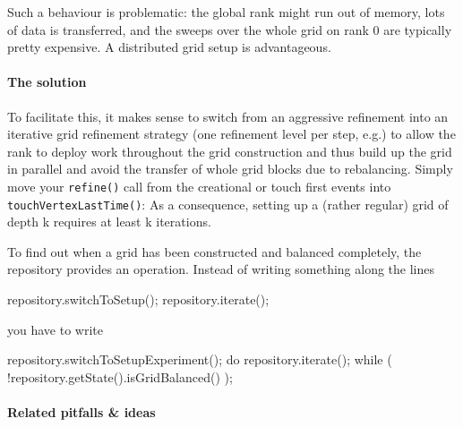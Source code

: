 Such a behaviour is problematic: the global rank might run out of memory, lots
of data is transferred, and the sweeps over the whole grid on rank 0 are
typically pretty expensive. 
A distributed grid setup is advantageous.

\paragraph{The solution}

To facilitate this, it makes sense to switch from an aggressive
refinement into an iterative grid refinement strategy (one refinement level per
step, e.g.) to allow the rank to deploy work throughout the grid construction
and thus build up the grid in parallel and avoid the transfer of whole grid
blocks due to rebalancing.
Simply move your \texttt{refine()} call from the creational or touch first
events into \texttt{touchVertexLastTime()}:
As a consequence, setting up a (rather regular) grid of depth k requires at least k iterations. 


To find out when a grid has been constructed and balanced completely, the
repository provides an operation. Instead of writing something along the lines

\begin{code}
  repository.switchToSetup();
  repository.iterate();
\end{code}

\noindent
you have to write
\begin{code}
  repository.switchToSetupExperiment();
  do {
    repository.iterate();
  } while ( !repository.getState().isGridBalanced() );
\end{code}



\paragraph{Related pitfalls \& ideas}

